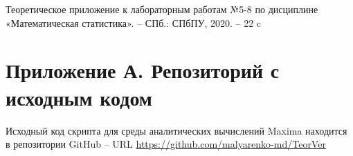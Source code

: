 \documentclass[12pt]{article}
\begin{document}
\begin{flushleft}
\begin{thebibliography}{1}
		Теоретическое приложение к лабораторным работам №5-8 по дисциплине «Математическая статистика». -- СПб.: СПбПУ, 2020. -- 22 c 

	\end{thebibliography}

\newpage

\section*{Приложение А. Репозиторий с исходным кодом}

Исходный код скрипта для среды аналитических вычислений Maxima находится в репозитории GitHub -- URL \url{https://github.com/malyarenko-md/TeorVer}

\end{flushleft}
\end{document}
